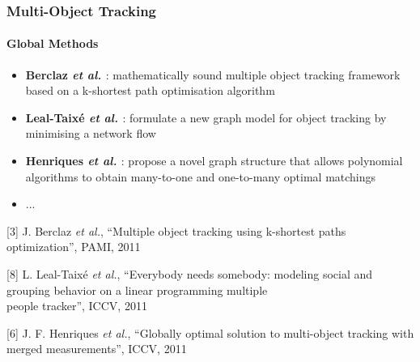 \begin{frame}
	\frametitle{Multi-Object Tracking}
	\framesubtitle{Global Methods}
	
	\Large
	
	\vspace{0.05cm}
	
	\begin{itemize}
		\item \textbf{Berclaz \emph{et al.} \cite{Berclaz11}}: mathematically sound multiple object
			  tracking framework based on a k-shortest path optimisation algorithm
		\item \textbf{Leal-Taix{\'e} \emph{et al.} \cite{Leal11}}: formulate a new graph model for
			  object tracking by minimising a network flow
		\item \textbf{Henriques \emph{et al.} \cite{Henriques11}}: propose a novel graph structure
			  that allows polynomial algorithms to obtain many-to-one and one-to-many optimal matchings
		\item ...
	\end{itemize}
	
	\vspace{0.15cm}
	
	\tiny
	
	[3] J. Berclaz \emph{et al.}, ``Multiple object tracking using k-shortest paths optimization'',
		PAMI, 2011
	
	\vspace{0.05cm}
	
	[8] L. Leal-Taix{\'e} \emph{et al.}, ``Everybody needs somebody: modeling social and grouping
		behavior on a linear programming multiple\\ \hspace{0.25cm} people tracker'', ICCV, 2011
	
	\vspace{-0.19cm}
	
	[6] J. F. Henriques \emph{et al.}, ``Globally optimal solution to multi-object tracking with merged
		measurements'', ICCV, 2011
\end{frame}

